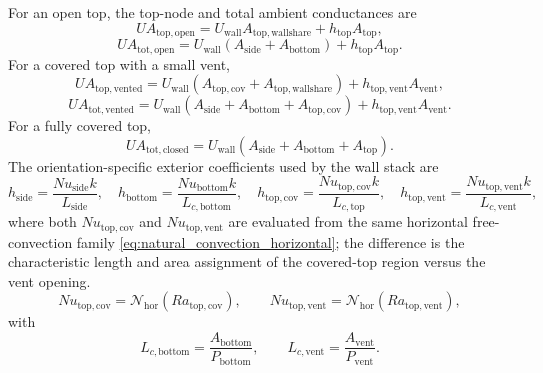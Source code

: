 \documentclass[11pt]{article}
\begin{document}
For an open top, the top-node and total ambient conductances are
\begin{equation}
\label{eq:topmode_open}
UA_{\mathrm{top,open}}=
U_{\mathrm{wall}}A_{\mathrm{top,wallshare}}
+h_{\mathrm{top}}A_{\mathrm{top}},
\end{equation}
\begin{equation}
\label{eq:ua_total_open}
UA_{\mathrm{tot,open}}=
U_{\mathrm{wall}}(A_{\mathrm{side}}+A_{\mathrm{bottom}})
+h_{\mathrm{top}}A_{\mathrm{top}}.
\end{equation}
For a covered top with a small vent,
\begin{equation}
\label{eq:topmode_vented}
UA_{\mathrm{top,vented}}=
U_{\mathrm{wall}}(A_{\mathrm{top,cov}}+A_{\mathrm{top,wallshare}})
+h_{\mathrm{top,vent}}A_{\mathrm{vent}},
\end{equation}
\begin{equation}
\label{eq:ua_total_vented}
UA_{\mathrm{tot,vented}}=
U_{\mathrm{wall}}(A_{\mathrm{side}}+A_{\mathrm{bottom}}+A_{\mathrm{top,cov}})
+h_{\mathrm{top,vent}}A_{\mathrm{vent}}.
\end{equation}
For a fully covered top,
\begin{equation}
\label{eq:topmode_closed}
UA_{\mathrm{tot,closed}}=
U_{\mathrm{wall}}(A_{\mathrm{side}}+A_{\mathrm{bottom}}+A_{\mathrm{top}}).
\end{equation}
The orientation-specific exterior coefficients used by the wall stack are
\begin{equation}
\label{eq:bin_orientation_h_coeffs}
h_{\mathrm{side}}=\frac{Nu_{\mathrm{side}}k}{L_{\mathrm{side}}},\quad
h_{\mathrm{bottom}}=\frac{Nu_{\mathrm{bottom}}k}{L_{c,\mathrm{bottom}}},\quad
h_{\mathrm{top,cov}}=\frac{Nu_{\mathrm{top,cov}}k}{L_{c,\mathrm{top}}},\quad
h_{\mathrm{top,vent}}=\frac{Nu_{\mathrm{top,vent}}k}{L_{c,\mathrm{vent}}},
\end{equation}
where both \(Nu_{\mathrm{top,cov}}\) and \(Nu_{\mathrm{top,vent}}\) are evaluated from the same horizontal free-convection family \eqref{eq:natural_convection_horizontal}; the difference is the characteristic length and area assignment of the covered-top region versus the vent opening.
\begin{equation}
\label{eq:top_cover_vent_nu_family}
Nu_{\mathrm{top,cov}}=\mathcal{N}_{\mathrm{hor}}\!\left(Ra_{\mathrm{top,cov}}\right),\qquad
Nu_{\mathrm{top,vent}}=\mathcal{N}_{\mathrm{hor}}\!\left(Ra_{\mathrm{top,vent}}\right),
\end{equation}
with
\begin{equation}
\label{eq:bin_characteristic_lengths}
L_{c,\mathrm{bottom}}=\frac{A_{\mathrm{bottom}}}{P_{\mathrm{bottom}}},\qquad
L_{c,\mathrm{vent}}=\frac{A_{\mathrm{vent}}}{P_{\mathrm{vent}}}.
\end{equation}
\end{document}
